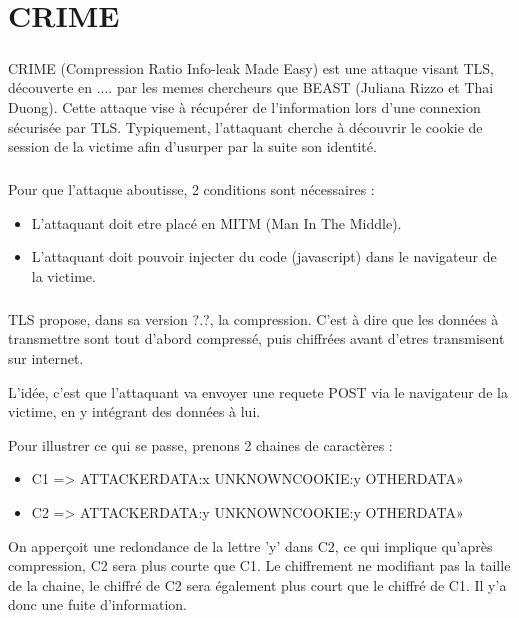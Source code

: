 \chapter{CRIME}
\label{chapter:crime}

\paragraph{}
CRIME (Compression Ratio Info-leak Made Easy) est une attaque visant TLS, découverte en .... par les memes chercheurs que BEAST (Juliana Rizzo et Thai Duong). Cette attaque vise à récupérer de l'information lors d'une connexion sécurisée par TLS. Typiquement, l'attaquant cherche à découvrir le cookie de session de la victime afin d'usurper par la suite son identité.

\paragraph{}
Pour que l'attaque aboutisse, 2 conditions sont nécessaires :
\begin{itemize}
  \item L'attaquant doit etre placé en MITM (Man In The Middle).
  \item L'attaquant doit pouvoir injecter du code (javascript) dans le navigateur de la victime.
\end{itemize}

\paragraph{}
TLS propose, dans sa version ?.?, la compression. C'est à dire que les données à transmettre sont tout d'abord compressé, puis chiffrées avant d'etres transmisent sur internet.

L'idée, c'est que l'attaquant va envoyer une requete POST via le navigateur de la victime, en y intégrant des données à lui.

Pour illustrer ce qui se passe, prenons 2 chaines de caractères :
\begin{itemize}
\item C1 => ATTACKERDATA:x UNKNOWNCOOKIE:y OTHERDATA»
\item C2 => ATTACKERDATA:y UNKNOWNCOOKIE:y OTHERDATA»
\end{itemize}
On apperçoit une redondance de la lettre 'y' dans C2, ce qui implique qu'après compression, C2 sera plus courte que C1. Le chiffrement ne modifiant pas la taille de la chaine, le chiffré de C2 sera également plus court que le chiffré de C1. Il y'a donc une fuite d'information.

